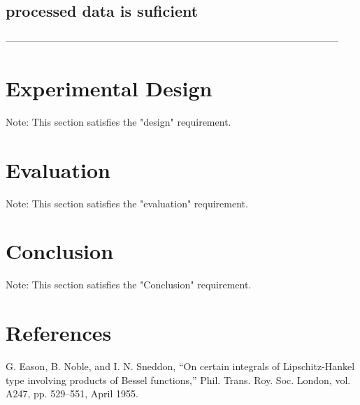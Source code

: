 \documentclass[conference]{IEEEtran}
\begin{document}
\subsection{processed data is suficient}


------------------------------------------------------------------------------------------------------

\section{Experimental Design}


Note: This section satisfies the "design" requirement.

\section{Evaluation}
Note: This section satisfies the "evaluation" requirement.


\section{Conclusion}
Note: This section satisfies the "Conclusion" requirement.



\section*{References}
\begin{thebibliography}{00}
     G. Eason, B. Noble, and I. N. Sneddon, ``On certain integrals of Lipschitz-Hankel type involving products of Bessel functions,'' Phil. Trans. Roy. Soc. London, vol. A247, pp. 529--551, April 1955.
\end{thebibliography}
\end{document}
